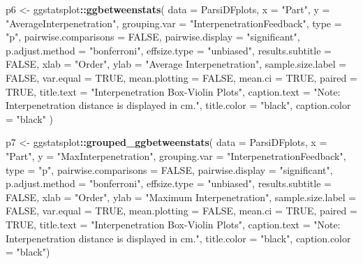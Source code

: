 \documentclass[
]{article}
\newenvironment{Shaded}{\begin{snugshade}}{\end{snugshade}}
\newcommand{\DataTypeTok}[1]{\textcolor[rgb]{0.13,0.29,0.53}{#1}}
\newcommand{\KeywordTok}[1]{\textcolor[rgb]{0.13,0.29,0.53}{\textbf{#1}}}
\newcommand{\NormalTok}[1]{#1}
\newcommand{\OperatorTok}[1]{\textcolor[rgb]{0.81,0.36,0.00}{\textbf{#1}}}
\newcommand{\OtherTok}[1]{\textcolor[rgb]{0.56,0.35,0.01}{#1}}
\newcommand{\StringTok}[1]{\textcolor[rgb]{0.31,0.60,0.02}{#1}}
\begin{document}
\begin{Shaded}
\begin{Highlighting}[]
\NormalTok{p6 <-}\StringTok{ }\NormalTok{ggstatsplot}\OperatorTok{::}\KeywordTok{ggbetweenstats}\NormalTok{(}
  \DataTypeTok{data =}\NormalTok{ ParsiDFplots,}
  \DataTypeTok{x =} \StringTok{"Part"}\NormalTok{,}
  \DataTypeTok{y =} \StringTok{"AverageInterpenetration"}\NormalTok{,}
  \DataTypeTok{grouping.var =} \StringTok{"InterpenetrationFeedback"}\NormalTok{,}
  \DataTypeTok{type =} \StringTok{"p"}\NormalTok{,}
  \DataTypeTok{pairwise.comparisons =} \OtherTok{FALSE}\NormalTok{,}
  \DataTypeTok{pairwise.display =} \StringTok{"significant"}\NormalTok{,}
  \DataTypeTok{p.adjust.method =} \StringTok{"bonferroni"}\NormalTok{,}
  \DataTypeTok{effsize.type =} \StringTok{"unbiased"}\NormalTok{,}
  \DataTypeTok{results.subtitle =} \OtherTok{FALSE}\NormalTok{,}
  \DataTypeTok{xlab =} \StringTok{"Order"}\NormalTok{,}
  \DataTypeTok{ylab =} \StringTok{"Average Interpenetration"}\NormalTok{,}
  \DataTypeTok{sample.size.label =} \OtherTok{FALSE}\NormalTok{,}
  \DataTypeTok{var.equal =} \OtherTok{TRUE}\NormalTok{,}
  \DataTypeTok{mean.plotting =} \OtherTok{FALSE}\NormalTok{,}
  \DataTypeTok{mean.ci =} \OtherTok{TRUE}\NormalTok{,}
  \DataTypeTok{paired =} \OtherTok{TRUE}\NormalTok{,}
  \DataTypeTok{title.text =} \StringTok{"Interpenetration Box-Violin Plots"}\NormalTok{,}
  \DataTypeTok{caption.text =} \StringTok{"Note: Interpenetration distance is displayed in cm."}\NormalTok{,}
  \DataTypeTok{title.color =} \StringTok{"black"}\NormalTok{,}
  \DataTypeTok{caption.color =} \StringTok{"black"}
\NormalTok{) }

\NormalTok{p7 <-}\StringTok{ }\NormalTok{ggstatsplot}\OperatorTok{::}\KeywordTok{grouped_ggbetweenstats}\NormalTok{(}
  \DataTypeTok{data =}\NormalTok{ ParsiDFplots,}
  \DataTypeTok{x =} \StringTok{"Part"}\NormalTok{,}
  \DataTypeTok{y =} \StringTok{"MaxInterpenetration"}\NormalTok{,}
  \DataTypeTok{grouping.var =} \StringTok{"InterpenetrationFeedback"}\NormalTok{,}
  \DataTypeTok{type =} \StringTok{"p"}\NormalTok{,}
  \DataTypeTok{pairwise.comparisons =} \OtherTok{FALSE}\NormalTok{,}
  \DataTypeTok{pairwise.display =} \StringTok{"significant"}\NormalTok{,}
  \DataTypeTok{p.adjust.method =} \StringTok{"bonferroni"}\NormalTok{,}
  \DataTypeTok{effsize.type =} \StringTok{"unbiased"}\NormalTok{,}
  \DataTypeTok{results.subtitle =} \OtherTok{FALSE}\NormalTok{,}
  \DataTypeTok{xlab =} \StringTok{"Order"}\NormalTok{,}
  \DataTypeTok{ylab =} \StringTok{"Maximum Interpenetration"}\NormalTok{,}
  \DataTypeTok{sample.size.label =} \OtherTok{FALSE}\NormalTok{,}
  \DataTypeTok{var.equal =} \OtherTok{TRUE}\NormalTok{,}
  \DataTypeTok{mean.plotting =} \OtherTok{FALSE}\NormalTok{,}
  \DataTypeTok{mean.ci =} \OtherTok{TRUE}\NormalTok{,}
  \DataTypeTok{paired =} \OtherTok{TRUE}\NormalTok{,}
  \DataTypeTok{title.text =} \StringTok{"Interpenetration Box-Violin Plots"}\NormalTok{,}
  \DataTypeTok{caption.text =} \StringTok{"Note: Interpenetration distance is displayed in cm."}\NormalTok{,}
  \DataTypeTok{title.color =} \StringTok{"black"}\NormalTok{,}
  \DataTypeTok{caption.color =} \StringTok{"black"}\NormalTok{) }


\end{Highlighting}
\end{Shaded}
\end{document}
